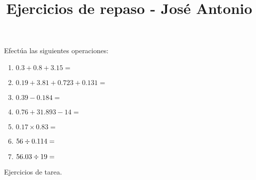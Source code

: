 

\title{Ejercicios de repaso - José Antonio \vspace{-2cm}}
\author{}
\date{ }

\renewcommand\thechoice{\Alph{choice})}
\newcommand\choicelabel{\thechoice}

\newenvironment{choices}%
  {\list{\choicelabel}%
     {\usecounter{choice}\def\makelabel##1{\hss\llap{##1}}%
       \settowidth{\leftmargin}{W.\hskip\labelsep\hskip 2.5em}%
       \def\choice{%
         \item
       } %
       \labelwidth\leftmargin\advance\labelwidth-\labelsep
       \topsep=0pt
       \partopsep=0pt
     }%
  }%
  {\endlist}

\newenvironment{oneparchoices}%
  {%
    \setcounter{choice}{0}%
    \def\choice{%
      \refstepcounter{choice}%
      \ifnum\value{choice}>1\relax
        \penalty -50\hskip 1em plus 1em\relax
      \fi
      \choicelabel
      \nobreak\enskip
    }%
    \ifvmode\else\enskip\fi
    \ignorespaces
  }%
  {}


\maketitle
\fontsize{14}{14}\selectfont

Efectúa las siguientes operaciones:

\begin{enumerate}[label=\alph*)]
\item $0.3 +0.8 +3.15 = $
\item $0.19 + 3.81+ 0.723+ 0.131 = $
\item $0.39 - 0.184 = $
\item $0.76 + 31.893 - 14 = $
\item $0.17 \times 0.83 = $
\item $56 \divisionsymbol 0.114 =$
\item $56.03 \divisionsymbol 19 =$
\end{enumerate}

\newpage

Ejercicios de tarea.

